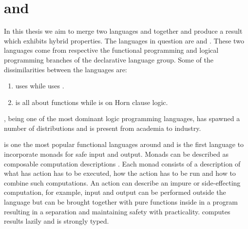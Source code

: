 \documentclass[thesis-solanki.tex]{subfiles}
\begin{document}
\section{ and }
In this thesis we aim to merge two languages  and 
together and produce a result which exhibits hybrid
properties.
The languages in question are  and .
%
These two languages come from respective the functional programming and logical programming branches of the declarative language group.
Some of the dissimilarities between the languages are:
\begin{enumerate}
\item {}
  uses  while  uses
  . 
\item {} is all about functions while  is on Horn clause logic.
\end{enumerate} 

 \cite{wikiprolog}, being one of the most dominant logic programming languages, has spawned a
number of distributions and is present from academia to industry.

 is one the most popular \cite{website:langpop} functional languages around and is the first
language to incorporate monads \cite{wadler1992comprehending} for safe input and output.
Monads
can be 
described as composable computation descriptions \cite{website:monadshaskellorg}.
Each monad
consists of a description of what has action has to be executed, how the action has to be run and how to combine
such computations.
An action can describe an impure or side-effecting computation, for example, input and output can be performed
outside the language but can be brought together with pure functions inside in a program resulting in a separation
and maintaining safety with practicality.
 computes results lazily and is strongly typed.
\end{document}
